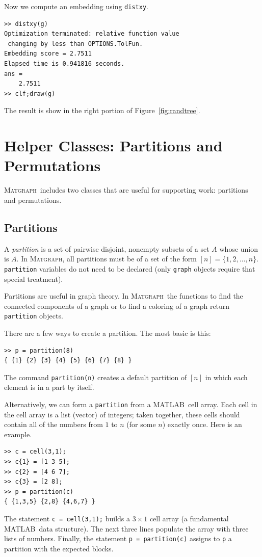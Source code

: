 \documentclass[12pt]{amsart}
\newcommand\matlab{MATLAB}
\newcommand\matgraph{\textsc{Matgraph}}
\begin{document}
Now we compute an embedding using \verb|distxy|.
\begin{verbatim}
>> distxy(g)
Optimization terminated: relative function value
 changing by less than OPTIONS.TolFun.
Embedding score = 2.7511
Elapsed time is 0.941816 seconds.
ans =
    2.7511
>> clf;draw(g)
\end{verbatim}
The result is show in the right portion of Figure~\ref{fig:randtree}.

\section{Helper Classes: Partitions and Permutations}

\matgraph\ includes two classes that are useful for supporting work:
partitions and permutations.

\subsection{Partitions}
A \emph{partition} is a set of pairwise disjoint, nonempty subsets of
a set $A$ whose union is $A$. In \matgraph, all partitions must be of
a set of the form $[n]=\{1,2,\ldots,n\}$. \verb|partition| variables
do not need to be declared (only \verb|graph| objects require that
special treatment).

Partitions are useful in graph theory. In \matgraph\, the functions to
find the connected components of a graph or to find a coloring of a
graph return \verb|partition| objects.

There are a few ways to create a partition. The most basic is this:
\begin{verbatim}
>> p = partition(8)
{ {1} {2} {3} {4} {5} {6} {7} {8} }
\end{verbatim}
The command \verb|partition(n)| creates a default partition of $[n]$
in which each element is in a part by itself. 

Alternatively, we can form a \verb|partition| from a \matlab\ cell
array. Each cell in the cell array is a list (vector) of integers;
taken together, these cells should contain all of the numbers from $1$
to $n$ (for some $n$) exactly once. Here is an example.
\begin{verbatim}
>> c = cell(3,1);
>> c{1} = [1 3 5];
>> c{2} = [4 6 7];
>> c{3} = [2 8];
>> p = partition(c)
{ {1,3,5} {2,8} {4,6,7} }
\end{verbatim}
The statement \verb|c = cell(3,1);| builds a $3\times1$ cell array
(a fundamental \matlab\ data structure). The next three lines populate
the array with three lists of numbers. Finally, the statement
\verb|p = partition(c)| assigns to \verb|p| a partition with the
expected blocks. 
\end{document}
